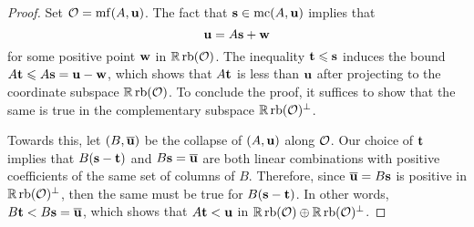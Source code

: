 \documentclass[11pt]{amsart}
\begin{document}
\begin{proof}  Set $\mathcal{O} = \operatorname{mf}(A, \mathbf{u})$.  The fact that $\mathbf{s} \in \operatorname{mc}(A, \mathbf{u})$  implies that \[ \mathbf{u} = A \mathbf{s} + \mathbf{w}\] for some positive point $\mathbf{w}$ in $\mathbb{R} \operatorname{rb}(\mathcal{O})$.     The inequality $\mathbf{t} \leqslant \mathbf{s}$ induces the bound $A \mathbf{t} \leqslant A \mathbf{s} = \mathbf{u} - \mathbf{w}$, which shows that $A\mathbf{t}$ is less than $\mathbf{u}$ after projecting to the coordinate subspace $\mathbb{R} \operatorname{rb}(\mathcal{O})$.  To conclude the proof, it suffices to show that the same is true in the complementary subspace $\mathbb{R} \operatorname{rb}(\mathcal{O})^{\perp}$.  

Towards this, let $(B,\overline{\mathbf{u}})$ be the collapse of $(A,\mathbf{u})$ along $\mathcal{O}$.  Our choice of $\mathbf{t}$ implies that $B( \mathbf{s} - \mathbf{t})$ and $B \mathbf{s} = \overline{\mathbf{u}}$ are both linear combinations with positive coefficients of the same set of columns of $B$.  Therefore, since $\overline{\mathbf{u}} = B \mathbf{s}$ is positive in $\mathbb{R} \operatorname{rb}(\mathcal{O})^{\perp}$, then the same must be true for $B(\mathbf{s} - \mathbf{t})$.  In other words, $B \mathbf{t} < B \mathbf{s} = \overline{\mathbf{u}}$, which shows that $A \mathbf{t} < \mathbf{u}$ in $\mathbb{R} \operatorname{rb}(\mathcal{O}) \oplus \mathbb{R} \operatorname{rb}(\mathcal{O})^{\perp}$.
\end{proof}


%
%
%
\end{document}

